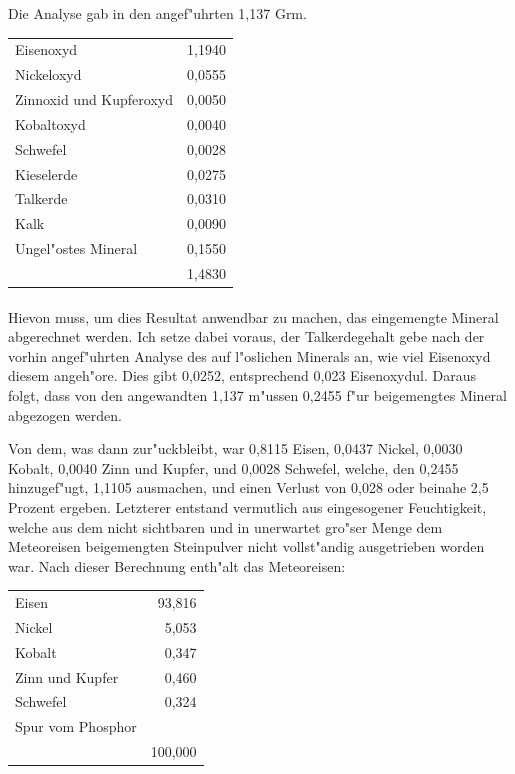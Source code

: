 \documentclass[a4paper, 11pt, oneside]{article}
\begin{document}
Die Analyse gab in den angef"uhrten 1,137 Grm.
\begin{center}
\begin{tabular}{ l r }
    Eisenoxyd & 1,1940\\
    Nickeloxyd & 0,0555\\
    Zinnoxid und Kupferoxyd & 0,0050\\
    Kobaltoxyd & 0,0040\\
    Schwefel & 0,0028\\
    Kieselerde & 0,0275\\
    Talkerde & 0,0310\\
    Kalk & 0,0090\\
    Ungel"ostes Mineral & 0,1550\\
     & 1,4830\\
\end{tabular}
\end{center}
\paragraph{}
Hievon muss, um dies Resultat anwendbar zu machen, das eingemengte Mineral abgerechnet werden. Ich setze dabei voraus, der Talkerdegehalt gebe nach der vorhin angef"uhrten Analyse des auf l"oslichen Minerals an, wie viel Eisenoxyd diesem angeh"ore. Dies gibt 0,0252, entsprechend 0,023 Eisenoxydul. Daraus folgt, dass von den angewandten 1,137 m"ussen 0,2455 f"ur beigemengtes Mineral abgezogen werden.

Von dem, was dann zur"uckbleibt, war 0,8115 Eisen, 0,0437 Nickel, 0,0030 Kobalt, 0,0040 Zinn und Kupfer, und 0,0028 Schwefel, welche, den 0,2455 hinzugef"ugt, 1,1105 ausmachen, und einen Verlust von 0,028 oder beinahe 2,5 Prozent ergeben. Letzterer entstand vermutlich aus eingesogener Feuchtigkeit, welche aus dem nicht sichtbaren und in unerwartet gro"ser Menge dem Meteoreisen beigemengten Steinpulver nicht vollst"andig ausgetrieben worden war. Nach dieser Berechnung enth"alt das Meteoreisen:
\begin{center}
\begin{tabular}{ l r }
    Eisen & 93,816\\
    Nickel & 5,053\\
    Kobalt & 0,347\\
    Zinn und Kupfer & 0,460\\
    Schwefel & 0,324\\
    Spur vom Phosphor & \\
     & 100,000\\
\end{tabular}
\end{center}
\end{document}
